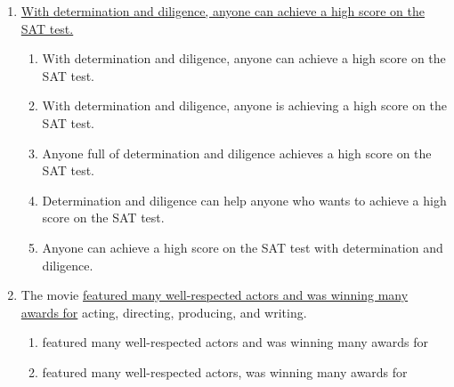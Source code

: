 \begin{enumerate}
\begin{spacing}{1.5}
\begin{enumerate}[label=(\Alph*)]
\hrulefill
 
\item for food, but organic food sells well despite the increased cost.

\hrulefill
\end{enumerate}
\end{spacing}

\bigskip
\item \ul{With determination and diligence, anyone can achieve a high score on the SAT test.}

\begin{spacing}{1.5}
\begin{enumerate}[label=(\Alph*)]

\item With determination and diligence, anyone can achieve a high score on the SAT test.

\hrulefill

\item With determination and diligence, anyone is achieving a high score on the SAT test.

\hrulefill

\item Anyone full of determination and diligence achieves a high score on the SAT test.

\hrulefill

\item Determination and diligence can help anyone who wants to achieve a high score on the SAT test.

\hrulefill

\item Anyone can achieve a high score on the SAT test with determination and diligence.

\hrulefill
\end{enumerate}
\end{spacing}

\bigskip
\item The movie \ul{featured many well-respected actors and was winning many awards for} acting, directing, producing, and writing. 

\begin{spacing}{1.5}
\begin{enumerate}[label=(\Alph*)]
\item featured many well-respected actors and was winning many awards for

\hrulefill
\item featured many well-respected actors, was winning many awards for


\end{enumerate}
\end{spacing}
\end{enumerate}
